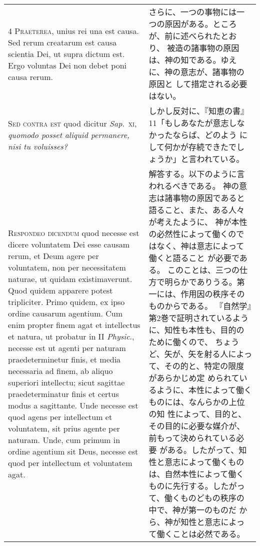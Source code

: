 \documentclass[10pt]{jsarticle} %
\begin{document}
\begin{longtable}{p{21em}p{21em}}
 

\\



{\scshape 4 Praeterea}, unius rei una est causa. Sed
 rerum creatarum est causa scientia Dei, ut supra dictum est. Ergo
 voluntas Dei non debet poni causa rerum.

 
&

さらに、一つの事物には一つの原因がある。ところが、前に述べられたとおり、
 被造の諸事物の原因は、神の知である。ゆえに、神の意志が、諸事物の原因と
 して措定される必要はない。

 
\\



{\scshape  Sed contra est} quod dicitur {\itshape Sap}.~{\scshape xi}, {\itshape quomodo
 posset aliquid permanere, nisi tu voluisses?}

 
&

しかし反対に、『知恵の書』11「もしあなたが意志しなかったならば、どのよう
 にして何かが存続できたでしょうか」と言われている。
 

\\



{\scshape Respondeo dicendum} quod necesse est dicere
 voluntatem Dei esse causam rerum, et Deum agere per voluntatem, non per
 necessitatem naturae, ut quidam existimaverunt. Quod quidem apparere
 potest tripliciter. Primo quidem, ex ipso ordine causarum agentium. Cum
 enim propter finem agat et intellectus et natura, ut probatur in II
{\itshape  Physic}., necesse est ut agenti per naturam praedeterminetur finis, et
 media necessaria ad finem, ab aliquo superiori intellectu; sicut
 sagittae praedeterminatur finis et certus modus a sagittante. Unde
 necesse est quod agens per intellectum et voluntatem, sit prius agente
 per naturam. Unde, cum primum in ordine agentium sit Deus, necesse est
 quod per intellectum et voluntatem agat.

 &

 解答する。以下のように言われるべきである。
 神の意志は諸事物の原因であると語ること、また、ある人々が考えたように、
 神が本性の必然性によって働くのではなく、神は意志によって働くと語ること
 が必要である。
このことは、三つの仕方で明らかでありうる。第一には、作用因の秩序そのものからである。
 『自然学』第2巻で証明されているように、知性も本性も、目的のために働くので、
 ちょうど、矢が、矢を射る人によって、その的と、特定の限度があらかじめ定
 められているように、本性によって働くものには、なんらかの上位の知
 性によって、目的と、その目的に必要な媒介が、前もって決められている必要
 がある。したがって、知性と意志によって働くものは、自然本性によって働く
 ものに先行する。したがって、働くものどもの秩序の中で、神が第一のものだ
 から、神が知性と意志によって働くことは必然である。



\end{longtable}
\end{document}
